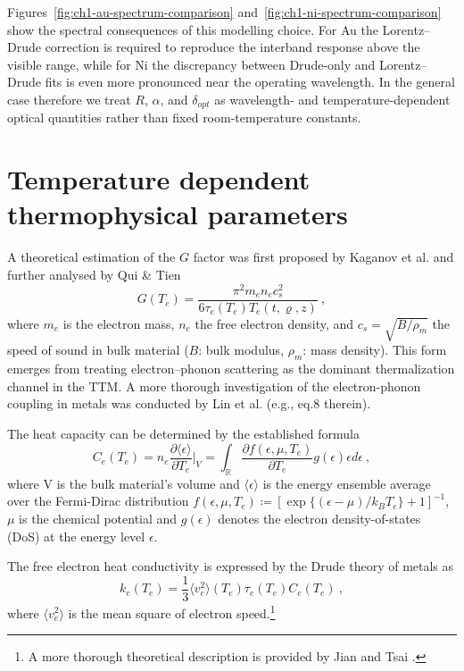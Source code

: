 Figures~\ref{fig:ch1-au-spectrum-comparison} and~\ref{fig:ch1-ni-spectrum-comparison} show the spectral consequences of this modelling choice. For Au the Lorentz--Drude correction is required to reproduce the interband response above the visible range, while for Ni the discrepancy between Drude-only and Lorentz--Drude fits is even more pronounced near the operating wavelength.
In the general case therefore we treat \(R\), \(\alpha\), and \(\delta_{opt}\) as wavelength- and temperature-dependent optical quantities rather than fixed room-temperature constants.

\section{Temperature dependent thermophysical parameters}
\label{sec:ch1-thermophysical-parameters}

A theoretical estimation of the $G$ factor was first proposed by Kaganov et al. \cite{Kaganov_1956} and further analysed by Qui \& Tien \cite{Qiu_1992}
\begin{equation}
  G(T_e) = \frac{\pi^2m_en_ec_s^2}{6\tau_e(T_e)T_e(t, \varrho, z)} \ ,
\end{equation}
where $m_e$ is the electron mass, $n_e$ the free electron density, and $c_s=\sqrt{B/\rho_m}$ the speed of sound in bulk material ($B$: bulk modulus, $\rho_m$: mass density).
This form emerges from treating electron--phonon scattering as the dominant thermalization channel in the TTM.
A more thorough investigation of the electron-phonon coupling in metals was conducted by Lin et al. \cite{Lin_2008} (e.g., eq.8 therein).

The heat capacity can be determined by the established formula \cite{Jiang_2005}
\begin{equation}
  C_e(T_e) = n_e \frac{\partial \langle \epsilon \rangle }{\partial T_e}\Biggl \vert_V = \int_\mathbb{R} \frac{\partial f(\epsilon, \mu, T_e)}{\partial T_e} g(\epsilon) \epsilon d\epsilon \ ,
\end{equation}
where V is the bulk material's volume and $\langle \epsilon \rangle$ is the energy ensemble average over the Fermi-Dirac distribution $f(\epsilon, \mu, T_e) \coloneqq [\exp\{(\epsilon - \mu)/k_BT_e\} +1]^{-1}$,
$\mu$ is the chemical potential and $g(\epsilon)$ denotes the electron density-of-states (DoS) at the energy level $\epsilon$.

The free electron heat conductivity is expressed by the Drude theory of metals as
\begin{equation}
  k_e(T_e) = \frac{1}{3} \langle v_e^2\rangle(T_e) \tau_e(T_e) C_e(T_e) \ ,
\end{equation}
where $\langle v_e^2 \rangle$ is the mean square of electron speed.\footnote{A more thorough theoretical description is provided by Jian and Tsai \cite{Jiang_2007}.}

